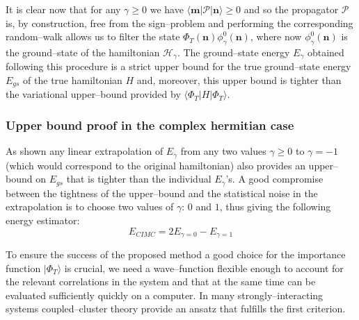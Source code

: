 It is clear now that for any $\gamma \geq 0$ we have $\langle \mathbf{m} \lvert \mathcal{P} \rvert \mathbf{n} \rangle \geq 0$ and so the propagator $\mathcal{P}$ is, by construction, free from the
sign--problem and performing the corresponding random--walk allows us to filter the state
$\Phi_T(\mathbf{n})\phi_{\gamma}^0(\mathbf{n})$, where now $\phi_{\gamma}^0(\mathbf{n})$ is the ground--state of the hamiltonian $\mathcal{H}_{\gamma}$. The ground--state energy $E_{\gamma}$ 
obtained following this procedure is a strict upper bound for the true ground--state energy $E_{gs}$ of the true hamiltonian $H$ and, moreover, this upper bound is tighter than the variational upper--bound
provided by $\langle \Phi_T \lvert H \rvert \Phi_T \rangle$. %

\subsubsection{Upper bound proof in the complex hermitian case}

As shown  any linear extrapolation of $E_{\gamma}$ from any two values $\gamma \geq 0$ to $\gamma = -1$ (which would correspond to the original hamiltonian) also
provides an upper--bound on $E_{gs}$ that is tighter than the individual $E_{\gamma}$'s. A good compromise between the tightness of the upper--bound and the statistical noise in
the extrapolation is to choose two values of $\gamma$: $0$ and $1$, thus giving the following energy estimator:
\begin{equation}
\label{cimc_extrap}
E_{CIMC} = 2 E_{\gamma=0} - E_{\gamma=1}
\end{equation}

To ensure the success of the proposed method a good choice for the importance function $\rvert \Phi_T \rangle$ is crucial, we need a wave--function flexible enough to account for the relevant correlations
in the system and that at the same time can be evaluated sufficiently quickly on a computer. In many strongly--interacting systems coupled--cluster theory provide an ansatz that fulfills the first criterion. 

